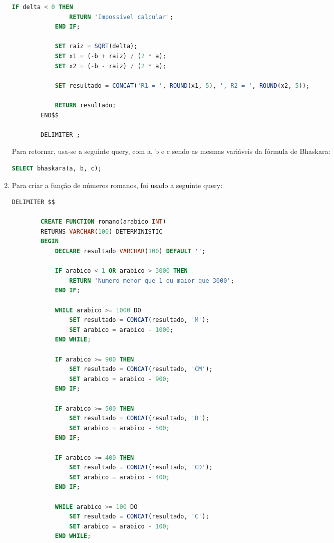 \documentclass{article}
\begin{document}
\begin{enumerate}[label=\alph*)]
\begin{lstlisting}[language=SQL]
            IF delta < 0 THEN
                RETURN 'Impossível calcular';
            END IF;

            SET raiz = SQRT(delta);
            SET x1 = (-b + raiz) / (2 * a);
            SET x2 = (-b - raiz) / (2 * a);

            SET resultado = CONCAT('R1 = ', ROUND(x1, 5), ', R2 = ', ROUND(x2, 5));

            RETURN resultado;
        END$$

        DELIMITER ;
    \end{lstlisting}

    Para retornar, usa-se a seguinte query, com a, b e c sendo as mesmas variáveis da fórmula de Bhaskara:

    \begin{lstlisting}[language=SQL]
        SELECT bhaskara(a, b, c);
    \end{lstlisting}

    \item Para criar a função de números romanos, foi usado a seguinte query:
    \begin{lstlisting}[language=SQL] 
        DELIMITER $$

        CREATE FUNCTION romano(arabico INT)
        RETURNS VARCHAR(100) DETERMINISTIC
        BEGIN
            DECLARE resultado VARCHAR(100) DEFAULT '';
            
            IF arabico < 1 OR arabico > 3000 THEN
                RETURN 'Numero menor que 1 ou maior que 3000';
            END IF;

            WHILE arabico >= 1000 DO
                SET resultado = CONCAT(resultado, 'M');
                SET arabico = arabico - 1000;
            END WHILE;

            IF arabico >= 900 THEN
                SET resultado = CONCAT(resultado, 'CM');
                SET arabico = arabico - 900;
            END IF;

            IF arabico >= 500 THEN
                SET resultado = CONCAT(resultado, 'D');
                SET arabico = arabico - 500;
            END IF;

            IF arabico >= 400 THEN
                SET resultado = CONCAT(resultado, 'CD');
                SET arabico = arabico - 400;
            END IF;

            WHILE arabico >= 100 DO
                SET resultado = CONCAT(resultado, 'C');
                SET arabico = arabico - 100;
            END WHILE;


\end{lstlisting}
\end{enumerate}
\end{document}
